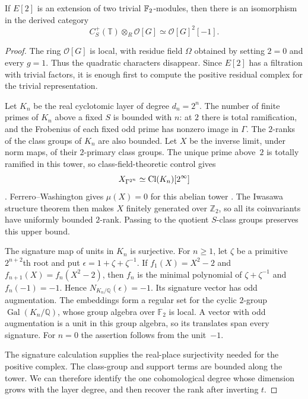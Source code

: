 \begin{lemma}\label{lem:cy:residual-free}
If $E[2]$ is an extension of two trivial $\mathbb F_2$-modules, then there is an
isomorphism in the derived category
\[
 C_S^+(\mathbb T)\otimes_R\mathcal O[G]
       \simeq \mathcal O[G]^2[-1].
\]
\end{lemma}
\begin{proof}
The ring $\mathcal O[G]$ is local, with residue field $\Omega$ obtained
by setting $2=0$ and every $g=1$.  Thus the quadratic characters disappear.
Since $E[2]$ has a filtration with trivial factors, it is enough first to
compute the positive residual complex for the trivial representation.

Let $K_n$ be the real cyclotomic layer of degree $d_n=2^n$.  The number
of finite primes of $K_n$ above a fixed $S$ is bounded with $n$: at $2$
there is total ramification, and the Frobenius of each fixed odd prime
has nonzero image in $\Gamma$.  The $2$-ranks of the class groups of
$K_n$ are also bounded. Let $X$ be the inverse limit, under norm maps, of
their $2$-primary class groups. The unique prime above~$2$ is totally
ramified in this tower, so class-field-theoretic control gives
\[
 X_{\Gamma^{2^n}}\simeq\operatorname{Cl}(K_n)[2^\infty]
\]
\cite[Proposition~3.2.11 and Remark~3.2.12]{SharifiIwasawa}.
Ferrero--Washington gives $\mu(X)=0$ for this abelian tower
\cite{FerreroWashington1979}. The Iwasawa structure theorem then makes
$X$ finitely generated over $\mathbb Z _2$, so all its coinvariants have
uniformly bounded $2$-rank. Passing to the quotient $S$-class groups
preserves this upper bound.

The signature map of units in $K_n$ is surjective.  For $n\geq1$, let
$\zeta$ be a primitive $2^{n+2}$th root and put
$\epsilon=1+\zeta+\zeta^{-1}$.  If $f_1(X)=X^2-2$ and
$f_{n+1}(X)=f_n(X^2-2)$, then $f_n$ is the minimal polynomial of
$\zeta+\zeta^{-1}$ and $f_n(-1)=-1$.  Hence
$N_{K_n/\mathbb Q}(\epsilon)=-1$.  Its signature vector has odd
augmentation.  The embeddings form a regular set for the cyclic
$2$-group $\operatorname{Gal}(K_n/\mathbb Q)$, whose group algebra over
$\mathbb F _2$ is local.  A vector with odd augmentation is a unit in
this group algebra, so its translates span every signature.  For $n=0$
the assertion follows from the unit~$-1$.

The signature calculation supplies the real-place surjectivity needed
for the positive complex. The class-group and support terms are bounded
along the tower. We can therefore identify the one cohomological degree
whose dimension grows with the layer degree, and then recover the rank
after inverting $t$.


\end{proof}
